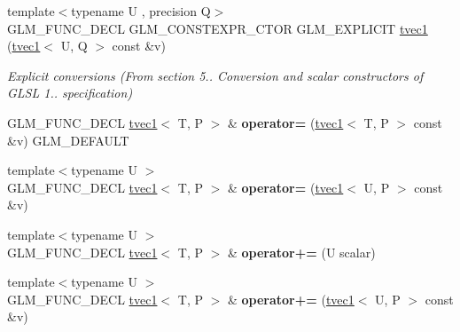 \begin{DoxyCompactItemize}
\mbox{\label{structglm_1_1tvec1_a9122f5419d51e798f0a249e8f0b2433a}} 
{\footnotesize template$<$typename U , precision Q$>$ }\\G\+L\+M\+\_\+\+F\+U\+N\+C\+\_\+\+D\+E\+CL G\+L\+M\+\_\+\+C\+O\+N\+S\+T\+E\+X\+P\+R\+\_\+\+C\+T\+OR G\+L\+M\+\_\+\+E\+X\+P\+L\+I\+C\+IT \hyperlink{structglm_1_1tvec1_a9122f5419d51e798f0a249e8f0b2433a}{tvec1} (\hyperlink{structglm_1_1tvec1}{tvec1}$<$ U, Q $>$ const \&v)
\begin{DoxyCompactList}\small\item\em Explicit conversions (From section 5.. Conversion and scalar constructors of G\+L\+SL 1.. specification) \end{DoxyCompactList}\item 
\mbox{\label{structglm_1_1tvec1_a317f46cddcdf81865c4970004e294055}} 
G\+L\+M\+\_\+\+F\+U\+N\+C\+\_\+\+D\+E\+CL \hyperlink{structglm_1_1tvec1}{tvec1}$<$ T, P $>$ \& {\bfseries operator=} (\hyperlink{structglm_1_1tvec1}{tvec1}$<$ T, P $>$ const \&v) G\+L\+M\+\_\+\+D\+E\+F\+A\+U\+LT
\item 
\mbox{\label{structglm_1_1tvec1_a472b0f4afb1f9efd1769597027a399f0}} 
{\footnotesize template$<$typename U $>$ }\\G\+L\+M\+\_\+\+F\+U\+N\+C\+\_\+\+D\+E\+CL \hyperlink{structglm_1_1tvec1}{tvec1}$<$ T, P $>$ \& {\bfseries operator=} (\hyperlink{structglm_1_1tvec1}{tvec1}$<$ U, P $>$ const \&v)
\item 
\mbox{\label{structglm_1_1tvec1_a12dd2a58cc8e8c2abba3aea0e54c7236}} 
{\footnotesize template$<$typename U $>$ }\\G\+L\+M\+\_\+\+F\+U\+N\+C\+\_\+\+D\+E\+CL \hyperlink{structglm_1_1tvec1}{tvec1}$<$ T, P $>$ \& {\bfseries operator+=} (U scalar)
\item 
\mbox{\label{structglm_1_1tvec1_af0d6bb22d35f767a748be6fa086c4911}} 
{\footnotesize template$<$typename U $>$ }\\G\+L\+M\+\_\+\+F\+U\+N\+C\+\_\+\+D\+E\+CL \hyperlink{structglm_1_1tvec1}{tvec1}$<$ T, P $>$ \& {\bfseries operator+=} (\hyperlink{structglm_1_1tvec1}{tvec1}$<$ U, P $>$ const \&v)
\item 
\mbox{\label{structglm_1_1tvec1_a2ade1f5cb35f7160222213a3c4052fec}} 

\end{DoxyCompactItemize}

